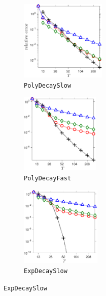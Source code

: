 \documentclass[final]{siamart1116}
\numberwithin{equation}{section}
\numberwithin{theorem}{section}
\numberwithin{figure}{section}
\begin{document}
\begin{figure}[htp!]
\begin{center}
\begin{subfigure}{.325\textwidth}
\begin{center}
\includegraphics[height=1.5in]{figures/PSLOW_Frobenius.pdf}
\caption{\texttt{PolyDecaySlow}}
\label{fig:PSLOW-algs}
\end{center}
\end{subfigure}
\begin{subfigure}{.325\textwidth}
\begin{center}
\includegraphics[height=1.5in]{figures/PFAST_Frobenius.pdf}
\caption{\texttt{PolyDecayFast}}
\label{fig:PFAST-algs}
\end{center}
\end{subfigure}
\begin{subfigure}{.325\textwidth}
\begin{center}
\includegraphics[height=1.5in]{figures/ESLOW_Frobenius.pdf}
\caption{\texttt{ExpDecaySlow}}
\label{fig:ESLOW-algs}
\end{center}
\end{subfigure}
\end{center}

\vspace{0.5em}


\end{figure}
\end{document}

